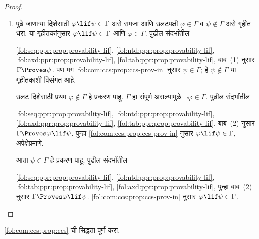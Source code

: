 \begin{proof}
\begin{enumerate}
उलट दिशेसाठी $\varphi \in \Gamma$ किंवा $\psi \in \Gamma$ असे समजा. पुढील
संदर्भांतील

  \ref{fol:seq:ppr:prop:provability-lor}, \ref{fol:ntd:ppr:prop:provability-lor}, \ref{fol:axd:ppr:prop:provability-lor}, \ref{fol:tab:ppr:prop:provability-lor}, बाब~(2) नुसार
$\Gamma \Proves \varphi \lor \psi$. \ref{fol:com:ccs:prop:ccs-prov-in} नुसार $\varphi \lor
\psi \in \Gamma$, अपेक्षेप्रमाणे.

\item

पुढे जाणाऱ्या दिशेसाठी $\varphi \lif \psi \in \Gamma$ असे समजा आणि उलटपक्षी
$\varphi \in \Gamma$ व $\psi \notin \Gamma$ असे गृहीत धरा. या गृहीतकांनुसार
$\varphi \lif \psi \in \Gamma$ आणि $\varphi \in \Gamma$. पुढील संदर्भांतील

  \ref{fol:seq:ppr:prop:provability-lif}, \ref{fol:ntd:ppr:prop:provability-lif}, \ref{fol:axd:ppr:prop:provability-lif}, \ref{fol:tab:ppr:prop:provability-lif}, बाब~(1) नुसार
$\Gamma \Proves \psi$. पण मग \ref{fol:com:ccs:prop:ccs-prov-in} नुसार $\psi \in
\Gamma$; हे $\psi \notin \Gamma$ या गृहीतकाशी विसंगत आहे.

उलट दिशेसाठी प्रथम $\varphi \notin \Gamma$ हे प्रकरण पाहू. $\Gamma$ हा
संपूर्ण असल्यामुळे $\lnot \varphi \in \Gamma$. पुढील संदर्भांतील

  \ref{fol:seq:ppr:prop:provability-lif}, \ref{fol:ntd:ppr:prop:provability-lif}, \ref{fol:axd:ppr:prop:provability-lif}, \ref{fol:tab:ppr:prop:provability-lif}, बाब~(2) नुसार
$\Gamma \Proves \varphi \lif \psi$. पुन्हा \ref{fol:com:ccs:prop:ccs-prov-in} नुसार
$\varphi \lif \psi \in \Gamma$, अपेक्षेप्रमाणे.

आता $\psi \in \Gamma$ हे प्रकरण पाहू. पुढील संदर्भांतील

  \ref{fol:seq:ppr:prop:provability-lif}, \ref{fol:ntd:ppr:prop:provability-lif}, \ref{fol:tab:ppr:prop:provability-lif}, \ref{fol:axd:ppr:prop:provability-lif},
पुन्हा बाब~(2) नुसार $\Gamma \Proves \varphi \lif \psi$.
\ref{fol:com:ccs:prop:ccs-prov-in} नुसार $\varphi \lif \psi \in \Gamma$.
\end{enumerate}
\end{proof}


\begin{prob}
\ref{fol:com:ccs:prop:ccs} ची सिद्धता पूर्ण करा.
\end{prob}















